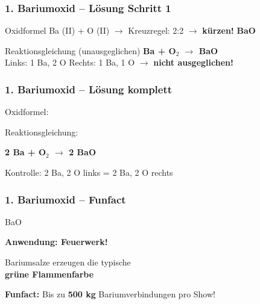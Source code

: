 \documentclass[aspectratio=169, 12pt]{beamer}
\newcommand{\lsg}[1]{\textcolor{loesung}{\textbf{#1}}}
\begin{document}
\begin{frame}
\frametitle{1. Bariumoxid – Lösung Schritt 1}
\begin{block}{Oxidformel}
Ba (II) + O (II) $\rightarrow$ Kreuzregel: 2:2 $\rightarrow$ \textbf{kürzen!} \hfill \lsg{BaO}
\end{block}
\vspace{0.3cm}
\begin{block}{Reaktionsgleichung (unausgeglichen)}
\lsg{Ba + O$_2$ $\rightarrow$ BaO}\\[0.3cm]
Links: 1 Ba, 2 O \quad Rechts: 1 Ba, 1 O \quad $\rightarrow$ \textbf{nicht ausgeglichen!}
\end{block}
\end{frame}

\begin{frame}
\frametitle{1. Bariumoxid – Lösung komplett}
\begin{center}
\vspace{0.5cm}
{\large Oxidformel:} \quad {\Huge \lsg{BaO}}
\vspace{1cm}

{\large Reaktionsgleichung:}
\vspace{0.5cm}

{\Huge \lsg{2 Ba + O$_2$ $\rightarrow$ 2 BaO}}
\vspace{0.5cm}

{\small Kontrolle: 2 Ba, 2 O links = 2 Ba, 2 O rechts \checkmark}
\end{center}
\end{frame}

\begin{frame}
\frametitle{1. Bariumoxid – Funfact}
\begin{center}
\vspace{0.3cm}
{\Huge \textcolor{chemie}{BaO}}
\vspace{0.8cm}

{\Large\textbf{Anwendung: Feuerwerk!}}
\vspace{0.5cm}

Bariumsalze erzeugen die typische\\[0.3cm]
{\Huge \textcolor{green!50!black}{\textbf{grüne Flammenfarbe}}}
\vspace{0.8cm}

\textcolor{akzent}{\textbf{Funfact:}} Bis zu \textbf{500 kg} Bariumverbindungen pro Show!
\end{center}
\end{frame}

\end{document}
